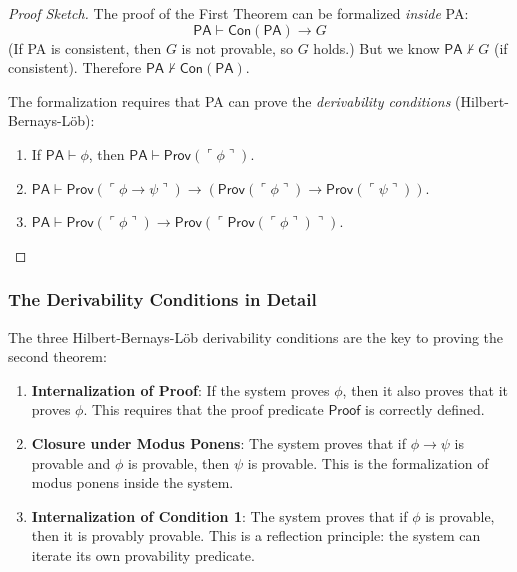 \begin{proof}[Proof Sketch]
The proof of the First Theorem can be formalized \emph{inside} PA:
\[
\mathsf{PA} \vdash \mathsf{Con}(\mathsf{PA}) \to G
\]
(If PA is consistent, then $G$ is not provable, so $G$ holds.) But we know $\mathsf{PA} \nvdash G$ (if consistent). Therefore $\mathsf{PA} \nvdash \mathsf{Con}(\mathsf{PA})$.

The formalization requires that PA can prove the \emph{derivability conditions} (Hilbert-Bernays-Löb):
\begin{enumerate}
\item If $\mathsf{PA} \vdash \phi$, then $\mathsf{PA} \vdash \mathsf{Prov}(\ulcorner \phi \urcorner)$.
\item $\mathsf{PA} \vdash \mathsf{Prov}(\ulcorner \phi \to \psi \urcorner) \to (\mathsf{Prov}(\ulcorner \phi \urcorner) \to \mathsf{Prov}(\ulcorner \psi \urcorner))$.
\item $\mathsf{PA} \vdash \mathsf{Prov}(\ulcorner \phi \urcorner) \to \mathsf{Prov}(\ulcorner \mathsf{Prov}(\ulcorner \phi \urcorner) \urcorner)$.
\end{enumerate}
\end{proof}

\subsubsection*{The Derivability Conditions in Detail}

The three Hilbert-Bernays-Löb derivability conditions are the key to proving the second theorem:

\begin{enumerate}
\item \textbf{Internalization of Proof}: If the system proves $\phi$, then it also proves that it proves $\phi$. This requires that the proof predicate $\mathsf{Proof}$ is correctly defined.

\item \textbf{Closure under Modus Ponens}: The system proves that if $\phi \to \psi$ is provable and $\phi$ is provable, then $\psi$ is provable. This is the formalization of modus ponens inside the system.

\item \textbf{Internalization of Condition 1}: The system proves that if $\phi$ is provable, then it is provably provable. This is a reflection principle: the system can iterate its own provability predicate.
\end{enumerate}

